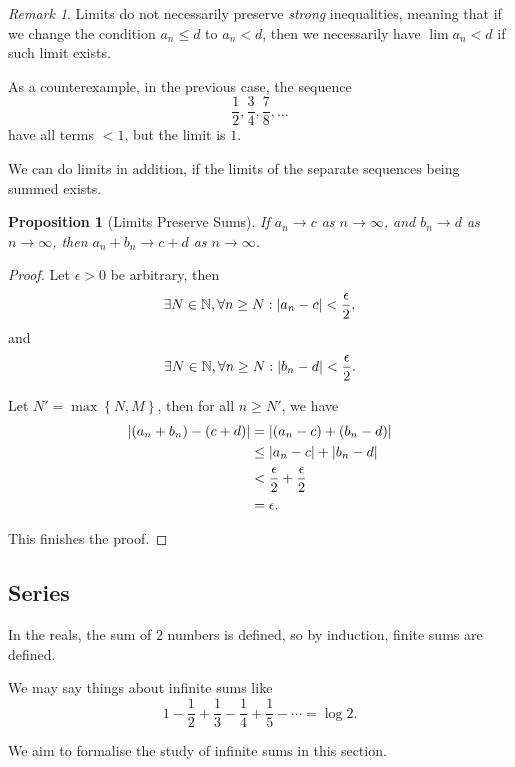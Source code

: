 \documentclass{article}
\newtheorem{proposition}[theorem]{Proposition}
\theoremstyle{definition}
\theoremstyle{remark}
\newtheorem{remark}[theorem]{Remark}
\DeclarePairedDelimiter{\abs}{\lvert}{\rvert}
\newcommand{\pqty}[1]{\left(#1\right)}
\newcommand{\Bqty}[1]{\left\{#1\right\}}
\newcommand{\NN}{\mathbb{N}}
\begin{document}
\begin{remark}
    Limits do not necessarily preserve \emph{strong} inequalities, meaning that if we change the condition \(a_n \leq d\) to \(a_n < d\), then we  necessarily have \(\lim a_n < d\) if such limit exists.

    As a counterexample, in the previous case, the sequence
    \[
        \frac{1}{2}, \frac{3}{4}, \frac{7}{8}, \ldots
    \]
    have all terms \(< 1\), but the limit is \(1\).
\end{remark}

We can do limits in addition, if the limits of the separate sequences being summed exists.

\begin{proposition}[Limits Preserve Sums]
    If \(a_n \to c\) as \(n \to \infty\), and \(b_n \to d\) as \(n \to \infty\), then \(a_n + b_n \to c + d\) as \(n \to \infty\).
\end{proposition}

\begin{proof}
    Let \(\epsilon > 0\) be arbitrary, then
    \[
        \exists N \in \NN, \forall n \geq N: \abs{a_n - c} < \frac{\epsilon}{2},
    \]
    and
    \[
        \exists N \in \NN, \forall n \geq N: \abs{b_n - d} < \frac{\epsilon}{2}.
    \]

    Let \(N' = \max\Bqty{N, M}\), then for all \(n \geq N'\), we have
    \begin{align*}
        \abs{\pqty{a_n + b_n} - \pqty{c + d}} &= \abs{\pqty{a_n - c} + \pqty{b_n - d}} \\
        &\leq \abs{a_n - c} + \abs{b_n - d} \\
        &< \frac{\epsilon}{2} + \frac{\epsilon}{2} \\
        &= \epsilon.
    \end{align*}

    This finishes the proof.
\end{proof}

\subsection{Series}
\label{sec:series}

In the reals, the sum of \(2\) numbers is defined, so by induction, finite sums are defined.

We may say things about infinite sums like
\[
    1 - \frac{1}{2} + \frac{1}{3} - \frac{1}{4} + \frac{1}{5} - \cdots = \log 2.
\]

We aim to formalise the study of infinite sums in this section.
\end{document}
